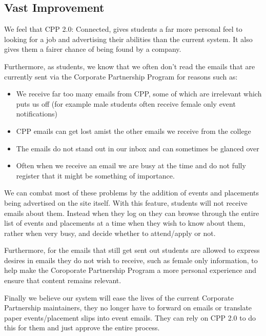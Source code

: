 \subsection{Vast Improvement}
We feel that CPP 2.0: Connected, gives students a far more personal feel to looking for a job and advertising their abilities than the current system. It also gives them a fairer chance of being found by a company.

Furthermore, as students, we know that we often don't read the emails that are currently sent via the Corporate Partnership Program for reasons such as:
\begin{itemize}
  \item We receive far too many emails from CPP, some of which are irrelevant which puts us off (for example male students often receive female only event notifications)
  \item CPP emails can get lost amist the other emails we receive from the college
  \item The emails do not stand out in our inbox and can sometimes be glanced over
  \item Often when we receive an email we are busy at the time and do not fully register that it might be something of importance.
\end{itemize} 

We can combat most of these problems by the addition of events and placements being advertised on the site itself. With this feature, students will not receive emails about them. Instead when they log on they can browse through the entire list of events and placements at a time when they wish to know about them, rather when very busy, and decide whether to attend/apply or not.

Furthermore, for the emails that still get sent out students are allowed to express desires in emails they do not wish to receive, such as female only information, to help make the Coroporate Partnership Program a more personal experience and ensure that content remains relevant. 

Finally we believe our system will ease the lives of the current Corporate Partnership maintainers, they no longer have to forward on emails or translate paper events/placement slips into event emails. They can rely on CPP 2.0 to do this for them and just approve the entire process.